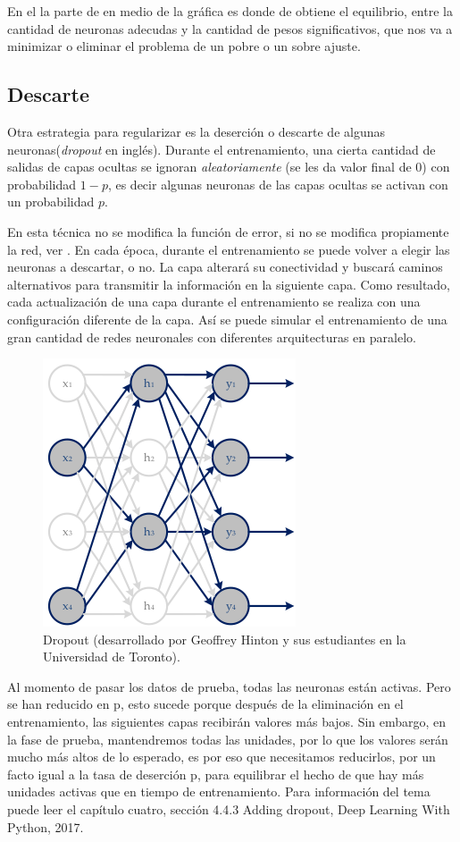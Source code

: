  En el la parte de en medio de la gráfica  es donde de obtiene el equilibrio, entre la cantidad de neuronas adecudas y la cantidad de pesos significativos, que nos va a minimizar o eliminar el problema de un pobre o un sobre ajuste.
 
 \subsection{Descarte}
 
 Otra estrategia para regularizar es la deserción o descarte de algunas neuronas(\emph{dropout} en inglés). 
 Durante el entrenamiento, una cierta cantidad de salidas de capas ocultas se ignoran \emph{aleatoriamente} (se les da valor final de 0) con probabilidad $1-p$, es decir algunas neuronas de las capas ocultas se activan con un probabilidad $p$. 

 En esta técnica no se modifica la función de error, si no se modifica propiamente la red, ver . En cada época, durante el entrenamiento se puede volver a elegir las neuronas a descartar, o no. 
 La capa alterará su conectividad y buscará caminos alternativos para transmitir la información en la siguiente capa. Como resultado, cada actualización de una capa durante el entrenamiento se realiza con una configuración diferente de la capa. Así se puede simular el entrenamiento de una gran cantidad de redes neuronales con diferentes arquitecturas en paralelo.

  \begin{figure}[h]
   \centering
   \includegraphics[scale=.5]{../Figuras/dropout.png}
   \caption{Dropout (desarrollado por Geoffrey Hinton y sus estudiantes en la Universidad de Toronto).}
  \label{fig:dropout}
  \end{figure}

 Al momento de pasar los datos de prueba, todas las neuronas están activas. Pero se han reducido en p, esto sucede porque después de la eliminación en el entrenamiento, las siguientes capas recibirán valores más bajos. Sin embargo, en la fase de prueba, mantendremos todas las unidades, por lo que los valores serán mucho más altos de lo esperado, es por eso que necesitamos reducirlos, por un facto igual a la tasa de deserción p, para equilibrar el hecho de que hay más unidades activas que en tiempo de entrenamiento. Para información del tema puede leer el capítulo cuatro, sección 4.4.3 Adding dropout, Deep Learning With Python, 2017.  
 
 

